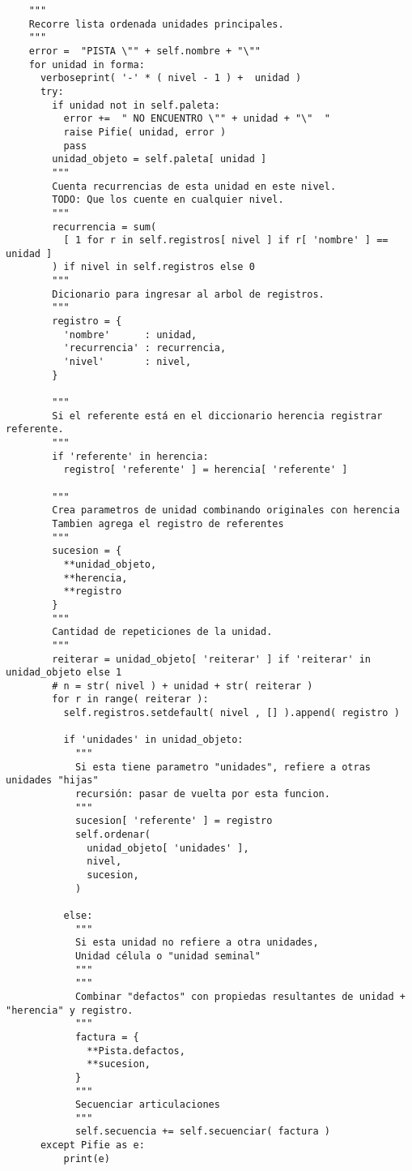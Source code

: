 \documentclass[]{article}
\begin{document}
\begin{verbatim}
    """
    Recorre lista ordenada unidades principales.
    """
    error =  "PISTA \"" + self.nombre + "\""
    for unidad in forma:  
      verboseprint( '-' * ( nivel - 1 ) +  unidad )
      try:
        if unidad not in self.paleta:
          error +=  " NO ENCUENTRO \"" + unidad + "\"  "  
          raise Pifie( unidad, error )
          pass
        unidad_objeto = self.paleta[ unidad ]
        """
        Cuenta recurrencias de esta unidad en este nivel.
        TODO: Que los cuente en cualquier nivel.
        """
        recurrencia = sum( 
          [ 1 for r in self.registros[ nivel ] if r[ 'nombre' ] == unidad ]
        ) if nivel in self.registros else 0 
        """
        Dicionario para ingresar al arbol de registros.
        """
        registro = { 
          'nombre'      : unidad,
          'recurrencia' : recurrencia,
          'nivel'       : nivel,
        }

        """
        Si el referente está en el diccionario herencia registrar referente.
        """
        if 'referente' in herencia:
          registro[ 'referente' ] = herencia[ 'referente' ] 

        """
        Crea parametros de unidad combinando originales con herencia
        Tambien agrega el registro de referentes
        """
        sucesion = {
          **unidad_objeto,
          **herencia,
          **registro
        } 
        """
        Cantidad de repeticiones de la unidad.
        """
        reiterar = unidad_objeto[ 'reiterar' ] if 'reiterar' in unidad_objeto else 1
        # n = str( nivel ) + unidad + str( reiterar )
        for r in range( reiterar ):
          self.registros.setdefault( nivel , [] ).append( registro )

          if 'unidades' in unidad_objeto:
            """
            Si esta tiene parametro "unidades", refiere a otras unidades "hijas" 
            recursión: pasar de vuelta por esta funcion.
            """
            sucesion[ 'referente' ] = registro 
            self.ordenar( 
              unidad_objeto[ 'unidades' ],
              nivel,
              sucesion,
            ) 

          else: 
            """
            Si esta unidad no refiere a otra unidades, 
            Unidad célula o "unidad seminal"
            """
            """
            Combinar "defactos" con propiedas resultantes de unidad + "herencia" y registro.
            """
            factura = {
              **Pista.defactos,
              **sucesion,
            }
            """
            Secuenciar articulaciones
            """
            self.secuencia += self.secuenciar( factura ) 
      except Pifie as e:
          print(e)


\end{verbatim}
\end{document}
